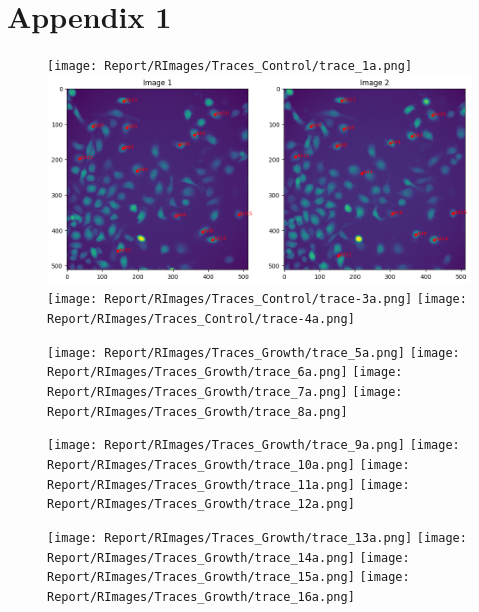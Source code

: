 \documentclass{article}
\begin{document}
\section*{Appendix 1}


\begin{figure}[h!]
\centering
\texttt{[image: Report/RImages/Traces\_Control/trace\_1a.png]}
\includegraphics[width=0.75\linewidth]{Report/RImages/Traces_Control/image_2a.png}
\texttt{[image: Report/RImages/Traces\_Control/trace-3a.png]}
\texttt{[image: Report/RImages/Traces\_Control/trace-4a.png]}
\end{figure}

\clearpage

\begin{figure}[h!]
\centering
\texttt{[image: Report/RImages/Traces\_Growth/trace\_5a.png]}
\texttt{[image: Report/RImages/Traces\_Growth/trace\_6a.png]}
\texttt{[image: Report/RImages/Traces\_Growth/trace\_7a.png]}
\texttt{[image: Report/RImages/Traces\_Growth/trace\_8a.png]}
\end{figure}

\clearpage

\begin{figure}[h!]
\centering
\texttt{[image: Report/RImages/Traces\_Growth/trace\_9a.png]}
\texttt{[image: Report/RImages/Traces\_Growth/trace\_10a.png]}
\texttt{[image: Report/RImages/Traces\_Growth/trace\_11a.png]}
\texttt{[image: Report/RImages/Traces\_Growth/trace\_12a.png]}
\end{figure}

\clearpage

\begin{figure}[h!]
\centering
\texttt{[image: Report/RImages/Traces\_Growth/trace\_13a.png]}
\texttt{[image: Report/RImages/Traces\_Growth/trace\_14a.png]}
\texttt{[image: Report/RImages/Traces\_Growth/trace\_15a.png]}
\texttt{[image: Report/RImages/Traces\_Growth/trace\_16a.png]}
\end{figure}

\clearpage
\end{document}
